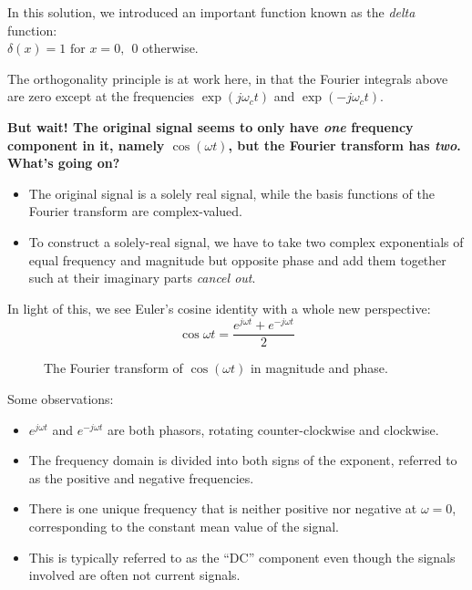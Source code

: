 \documentclass[11pt,letterpaper,draft]{exam}
\begin{document}
In this solution, we introduced an important function known as the
\textit{delta} function:\\
$\delta(x) = 1 \text { for } x=0, ~~0$ otherwise.

The orthogonality principle is at work here, in that the Fourier
integrals above are zero except at the frequencies $\exp(j\omega_c t)$
and $\exp(-j\omega_c t)$.

\textbf{But wait! The original signal seems to only have \textit{one} frequency
component in it, namely $\cos(\omega t)$, but the Fourier transform
has \textit{two}.  What's going on?}

\begin{itemize}
\item The original signal is a solely real signal, while
the basis functions of the Fourier transform are complex-valued.

\item To construct a solely-real signal, we have to take two complex
exponentials of equal frequency and magnitude but opposite phase and
add them together such at their imaginary parts \textit{cancel out}.
\end{itemize}

In light of this, we see Euler's cosine identity with a whole new perspective:
\begin{equation*}
\cos \omega t = \frac{e^{j \omega t} + e^{-j \omega t}}{2}
\end{equation*}

\begin{figure*}[ht]
\centering
\epsfxsize=5.0in
\caption{The Fourier transform of $\cos(\omega t)$ in magnitude and phase.}
\label{fig:cos_ft}
\end{figure*}

Some observations: 
\begin{itemize}
\item $e^{j \omega t}$ and $e^{-j \omega t}$ are both phasors, rotating
counter-clockwise and clockwise. 
\item The frequency domain is divided into
both signs of the exponent, referred to as the positive and negative
frequencies. 
\item There is one unique frequency that is neither positive nor
negative at $\omega
= 0$, corresponding to the constant mean value of the signal.  
\item This is typically
referred to as the ``DC'' component even though the signals involved are often not
current signals.
\end{itemize}
\end{document}
